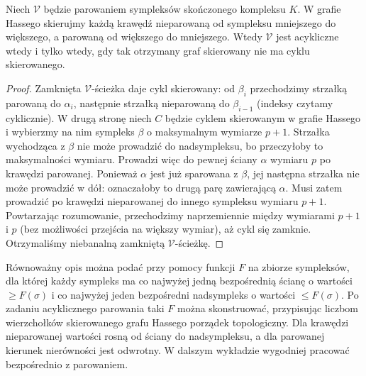 \begin{stwierdzenie}
\label{thm:tg-morse-acyclic}
Niech $\mathcal V$ będzie parowaniem sympleksów
skończonego kompleksu $K$. W grafie Hassego skierujmy
każdą krawędź nieparowaną od sympleksu mniejszego do
większego, a parowaną od większego do mniejszego.
Wtedy $\mathcal V$ jest acykliczne wtedy i tylko wtedy,
gdy tak otrzymany graf skierowany nie ma cyklu skierowanego.
\end{stwierdzenie}

\begin{proof}
Zamknięta $\mathcal V$-ścieżka daje cykl skierowany:
od $\beta_i$ przechodzimy strzałką parowaną do
$\alpha_i$, następnie strzałką nieparowaną do
$\beta_{i-1}$ (indeksy czytamy cyklicznie).
W drugą stronę niech $C$ będzie cyklem skierowanym
w grafie Hassego i wybierzmy na nim sympleks $\beta$
o maksymalnym wymiarze $p+1$. Strzałka wychodząca
z $\beta$ nie może prowadzić do nadsympleksu,
bo przeczyłoby to maksymalności wymiaru. Prowadzi
więc do pewnej ściany $\alpha$ wymiaru $p$ po
krawędzi parowanej. Ponieważ $\alpha$ jest już
sparowana z $\beta$, jej następna strzałka nie może
prowadzić w dół: oznaczałoby to drugą parę zawierającą
$\alpha$. Musi zatem prowadzić po krawędzi
nieparowanej do innego sympleksu wymiaru $p+1$.
Powtarzając rozumowanie, przechodzimy naprzemiennie
między wymiarami $p+1$ i $p$ (bez możliwości przejścia
na większy wymiar), aż cykl się zamknie. Otrzymaliśmy
niebanalną zamkniętą $\mathcal V$-ścieżkę.
\end{proof}

\begin{uwaga}
Równoważny opis można podać przy pomocy funkcji
$F$ na zbiorze sympleksów, dla której każdy sympleks
ma co najwyżej jedną bezpośrednią ścianę o wartości
$\ge F(\sigma)$ i co najwyżej jeden bezpośredni
nadsympleks o wartości $\le F(\sigma)$.
Po zadaniu acyklicznego parowania taki $F$ można
skonstruować, przypisując liczbom wierzchołków
skierowanego grafu Hassego porządek topologiczny.
Dla krawędzi nieparowanej wartości rosną od ściany
do nadsympleksu, a dla parowanej kierunek nierówności
jest odwrotny. W dalszym wykładzie wygodniej
pracować bezpośrednio z parowaniem.
\end{uwaga}

